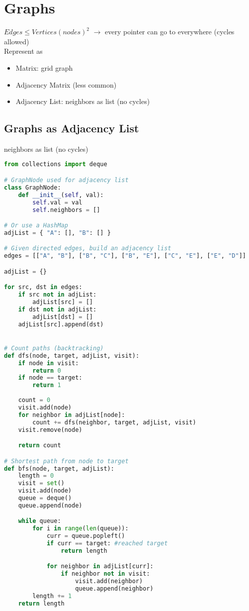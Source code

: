 \documentclass[english, threecolumn]{latex4ei/latex4ei_sheet}
\begin{document}
\section{Graphs}
\begin{sectionbox}
$Edges ≤ Vertices(nodes)^2 $  $\rightarrow$ every pointer can go to everywhere (cycles allowed)\\
Represent as
\begin{itemize}
    \item Matrix: grid graph
    \item Adjacency Matrix (less common)
    \item Adjacency List: neighbors as list (no cycles)
\end{itemize}
\end{sectionbox}

\begin{sectionbox}
\subsection{Graphs as Adjacency List}
neighbors as list (no cycles)
\begin{lstlisting}[language=python, gobble=0]
from collections import deque

# GraphNode used for adjacency list
class GraphNode:
    def __init__(self, val):
        self.val = val
        self.neighbors = []

# Or use a HashMap
adjList = { "A": [], "B": [] }

# Given directed edges, build an adjacency list
edges = [["A", "B"], ["B", "C"], ["B", "E"], ["C", "E"], ["E", "D"]]

adjList = {}

for src, dst in edges:
    if src not in adjList:
        adjList[src] = []
    if dst not in adjList:
        adjList[dst] = []
    adjList[src].append(dst)


# Count paths (backtracking)
def dfs(node, target, adjList, visit):
    if node in visit:
        return 0
    if node == target:
        return 1
    
    count = 0
    visit.add(node)
    for neighbor in adjList[node]:
        count += dfs(neighbor, target, adjList, visit)
    visit.remove(node)

    return count

# Shortest path from node to target
def bfs(node, target, adjList):
    length = 0
    visit = set()
    visit.add(node)
    queue = deque()
    queue.append(node)

    while queue:
        for i in range(len(queue)):
            curr = queue.popleft()
            if curr == target: #reached target
                return length 

            for neighbor in adjList[curr]:
                if neighbor not in visit:
                    visit.add(neighbor)
                    queue.append(neighbor)
        length += 1
    return length
\end{lstlisting}
\end{sectionbox}
\end{document}
